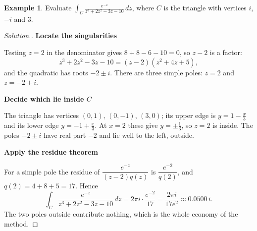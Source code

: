 \documentclass[11pt,a4paper]{article}
\theoremstyle{definition}
\newtheorem{example}[thm]{Example}
\newenvironment{solution}
  {\renewcommand{\qedsymbol}{}\begin{proof}[\textit{Solution}.]}
  {\end{proof}}
\newcommand{\subhead}[1]{%
  \par\medskip\noindent\textbf{#1}\par\nobreak\smallskip}
\begin{document}
\begin{example}
Evaluate $\displaystyle{\int_C \frac{e^{-z}}{z^3 + 2z^2 - 3z - 10}\,dz}$, where
$C$ is the triangle with vertices $i$, $-i$ and $3$.
\end{example}
\begin{solution}
\subhead{Locate the singularities}
Testing $z=2$ in the denominator gives $8+8-6-10=0$, so $z-2$ is a factor:
$$z^3+2z^2-3z-10=(z-2)\left(z^2+4z+5\right),$$
and the quadratic has roots $-2\pm i$. There are three simple poles: $z=2$ and
$z=-2\pm i$.

\subhead{Decide which lie inside $C$}
The triangle has vertices $(0,1)$, $(0,-1)$, $(3,0)$; its upper edge is
$y=1-\frac{x}{3}$ and its lower edge $y=-1+\frac{x}{3}$. At $x=2$ these give
$y=\pm\frac13$, so $z=2$ is inside. The poles $-2\pm i$ have real part $-2$ and
lie well to the left, outside.

\subhead{Apply the residue theorem}
For a simple pole the residue of $\dfrac{e^{-z}}{(z-2)q(z)}$ is
$\dfrac{e^{-2}}{q(2)}$, and $q(2)=4+8+5=17$. Hence
$$\int_C \frac{e^{-z}}{z^3+2z^2-3z-10}\,dz=2\pi i\cdot\frac{e^{-2}}{17}
=\frac{2\pi i}{17e^{2}}\approx 0.0500\,i .$$
The two poles outside contribute nothing, which is the whole economy of the
method.
\end{solution}
\end{document}
